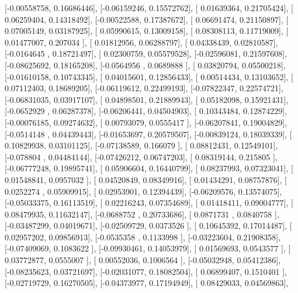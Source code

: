 \documentclass{article}
\begin{document}
       [-0.00558758,  0.16686446],
       [-0.06159246,  0.15572762],
       [ 0.01639364,  0.21705424],
       [ 0.06259404,  0.14318492],
       [-0.00522588,  0.17387672],
       [ 0.06691474,  0.21150897],
       [ 0.07005149,  0.03187925],
       [ 0.05990615,  0.13009158],
       [ 0.08308113,  0.11719009],
       [ 0.01477007,  0.207034  ],
       [ 0.01812956,  0.06288797],
       [ 0.04338439,  0.02810587],
       [-0.0164645 ,  0.18721497],
       [ 0.02300759,  0.05579528],
       [-0.02596081,  0.21597608],
       [-0.08625692,  0.18165208],
       [-0.0564956 ,  0.0689888 ],
       [ 0.03820794,  0.05500218],
       [-0.01610158,  0.10743345],
       [ 0.04015601,  0.12856433],
       [ 0.00514434,  0.13103652],
       [ 0.07112403,  0.18689205],
       [-0.06119612,  0.22499193],
       [-0.07822347,  0.22574721],
       [-0.06831035,  0.03917107],
       [ 0.04898501,  0.21889943],
       [ 0.05182098,  0.15921431],
       [-0.0652929 ,  0.06287378],
       [-0.06206441,  0.04504903],
       [ 0.10343484,  0.12874229],
       [-0.00076185,  0.09274632],
       [ 0.00793079,  0.0555417 ],
       [-0.06207841,  0.19004829],
       [-0.0514148 ,  0.04439443],
       [-0.01653697,  0.20579507],
       [-0.00839124,  0.18039339],
       [ 0.10829938,  0.03101125],
       [-0.07138589,  0.166079  ],
       [ 0.08812431,  0.12549101],
       [-0.078804  ,  0.04484144],
       [-0.07426212,  0.06747203],
       [ 0.08319144,  0.215805  ],
       [-0.06777248,  0.19895741],
       [ 0.05906604,  0.16440799],
       [ 0.08237993,  0.07323041],
       [ 0.01548841,  0.0957032 ],
       [ 0.04520849,  0.08349916],
       [ 0.01434291,  0.08757876],
       [ 0.0252274 ,  0.05909915],
       [ 0.02953901,  0.12394439],
       [-0.06209576,  0.13574075],
       [-0.05033375,  0.16113519],
       [ 0.02216243,  0.07354689],
       [ 0.01418411,  0.09004777],
       [ 0.08479935,  0.11632147],
       [-0.0688752 ,  0.20733686],
       [ 0.0871731 ,  0.0840758 ],
       [-0.03487299,  0.04019671],
       [-0.02509729,  0.0373526 ],
       [ 0.10645392,  0.17014487],
       [ 0.02957202,  0.09856913],
       [-0.0535358 ,  0.1133998 ],
       [-0.03223604,  0.21908358],
       [-0.07409069,  0.1083622 ],
       [-0.09930461,  0.14053979],
       [ 0.01569693,  0.0543577 ],
       [ 0.03772877,  0.0555007 ],
       [ 0.00552036,  0.1006564 ],
       [-0.05032948,  0.05412386],
       [-0.08235623,  0.03721697],
       [-0.02031077,  0.18082504],
       [ 0.06899407,  0.1510401 ],
       [-0.02719729,  0.16270505],
       [-0.04373977,  0.17194949],
       [ 0.08429033,  0.04569863],
\end{document}
